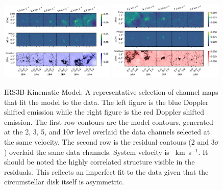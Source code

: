 
\begin{figure}[H]
\begin{center}
\includegraphics[width=0.49\textwidth]{img/Channelplot_irs3bplotblue_C17O.pdf}
\includegraphics[width=0.49\textwidth]{img/Channelplot_irs3bplotred_C17O.pdf}
\end{center}
\caption{IRS3B Kinematic Model: A representative selection of channel maps that fit the model to the data. The left figure is the blue Doppler shifted emission while the right figure is the red Doppler shifted emission. The first row contours are the model contours, generated at the 2, 3, 5, and 10$\sigma$ level overlaid the data channels selected at the same velocity. The second row is the residual contours (2 and 3$\sigma$) overlaid the same data channels. System velocity is ~km~s$^{-1}$. It should be noted the highly correlated structure visible in the residuals. This reflects an imperfect fit to the data given that the circumstellar disk itself is asymmetric.}\label{fig:c17o_res}
\end{figure}



